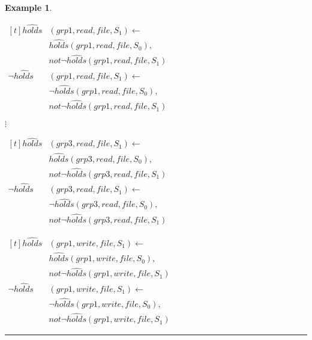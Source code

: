\documentclass[10pt, twocolumn]{article}
\newtheorem{examp}{Example}
\newenvironment{example}{\begin{examp}\rm}{\rule{2mm}{2mm}\end{examp}}
\begin{document}
\begin{example}
\begin{enumerate}
              \begin{math}
                \begin{aligned}[t]
                  \hat{holds}&(grp1, read, file, S_{1}) \leftarrow \\
                  & \hat{holds}(grp1, read, file, S_{0}), \\
                  & not \lnot \hat{holds}(grp1, read, file, S_{1}) \\
                  \lnot \hat{holds}&(grp1, read, file, S_{1}) \leftarrow \\
                  & \lnot \hat{holds}(grp1, read, file, S_{0}), \\
                  & not \lnot \hat{holds}(grp1, read, file, S_{1})
                \end{aligned}
              \end{math}

              \hspace{1cm} $\vdots$

              \begin{math}
                \begin{aligned}[t]
                  \hat{holds}&(grp3, read, file, S_{1}) \leftarrow \\
                  & \hat{holds}(grp3, read, file, S_{0}), \\
                  & not \lnot \hat{holds}(grp3, read, file, S_{1}) \\
                  \lnot \hat{holds}&(grp3, read, file, S_{1}) \leftarrow \\
                  & \lnot \hat{holds}(grp3, read, file, S_{0}), \\
                  & not \lnot \hat{holds}(grp3, read, file, S_{1})
                \end{aligned}
              \end{math}

              \begin{math}
                \begin{aligned}[t]
                  \hat{holds}&(grp1, write, file, S_{1}) \leftarrow \\
                  & \hat{holds}(grp1, write, file, S_{0}), \\
                  & not \lnot \hat{holds}(grp1, write, file, S_{1}) \\
                  \lnot \hat{holds}&(grp1, write, file, S_{1}) \leftarrow \\
                  & \lnot \hat{holds}(grp1, write, file, S_{0}), \\
                  & not \lnot \hat{holds}(grp1, write, file, S_{1})
                \end{aligned}
              \end{math}


\end{enumerate}
\end{example}
\end{document}
